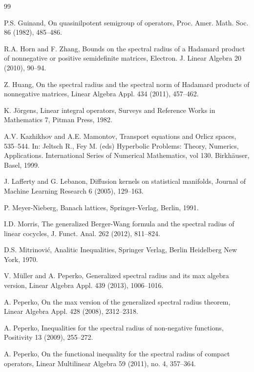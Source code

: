 \documentclass[12pt, reqno]{amsart}
\theoremstyle{definition}
\theoremstyle{remark}
\numberwithin{equation}{section}
\begin{document}
\begin{thebibliography}{99}

 P.S. Guinand, On quasinilpotent semigroup of operators,  Proc. Amer. Math. Soc. 86 (1982), 485--486.

 R.A. Horn and F. Zhang, Bounds on the spectral radius of a Hadamard product of nonnegative or positive semidefinite matrices,
 Electron. J. Linear Algebra 20 (2010), 90--94.

 Z. Huang, On the spectral radius and the spectral norm of Hadamard products of nonnegative matrices,
 Linear Algebra Appl. 434 (2011), 457--462.

 K. J\"{o}rgens,  Linear integral operators, Surveys and Reference Works in Mathematics 7, Pitman Press, 1982.

 A.V. Kazhikhov and  A.E. Mamontov, Transport equations and Orlicz spaces, 535--544. In: Jeltsch R., Fey M. (eds) Hyperbolic Problems: Theory, Numerics, Applications. International Series of Numerical Mathematics, vol 130. Birkh\"{a}user, Basel, 1999.

 J. Lafferty  and G. Lebanon, Diffusion kernels on statistical manifolds, Journal of Machine Learning Research 6 (2005), 129--163.

 P. Meyer-Nieberg,  Banach lattices,
    Springer-Verlag, Berlin, 1991.


 I.D. Morris, The generalized Berger-Wang formula and the spectral radius of linear cocycles, J. Funct. Anal. 262 (2012),  811--824.


 D.S. Mitrinovi\'{c}, Analitic Inequalities, Springer Verlag, Berlin Heidelberg New York, 1970.

 V. M\"uller and A. Peperko, Generalized spectral radius and its max algebra version,
 Linear Algebra Appl. 439  (2013), 1006--1016.

 A. Peperko, On the max version of the generalized spectral radius theorem,  Linear Algebra
         Appl. 428 (2008), 2312--2318.

 A. Peperko, Inequalities for the spectral radius of non-negative functions,
 Positivity 13 (2009), 255--272.

 A. Peperko, On the functional inequality for the spectral radius of compact operators, Linear Multilinear Algebra
 59 (2011), no. 4, 357--364.


\end{thebibliography}
\end{document}

